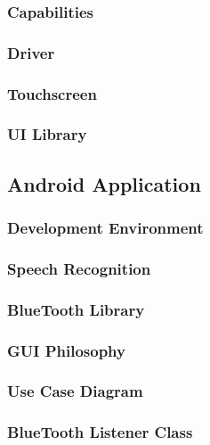 \subsubsection{Capabilities}

\subsubsection{Driver}

\subsubsection{Touchscreen}

\subsubsection{UI Library}

\subsection{Android Application}

\subsubsection{Development Environment}

\subsubsection{Speech Recognition}

\subsubsection{BlueTooth Library}

\subsubsection{GUI Philosophy}

\subsubsection{Use Case Diagram}

\subsubsection{BlueTooth Listener Class}

